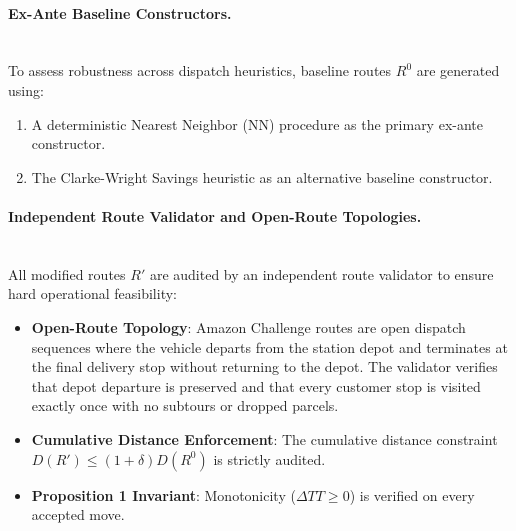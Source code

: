 \documentclass[11pt,a4paper]{article}
\begin{document}
\paragraph{Ex-Ante Baseline Constructors.}\mbox{}\\
To assess robustness across dispatch heuristics, baseline routes $R^0$ are generated using:
\begin{enumerate}
    \item A deterministic Nearest Neighbor (NN) procedure as the primary ex-ante constructor.
    \item The Clarke-Wright Savings heuristic \cite{clarke1964} as an alternative baseline constructor.
\end{enumerate}

\paragraph{Independent Route Validator and Open-Route Topologies.}\mbox{}\\
All modified routes $R'$ are audited by an independent route validator to ensure hard operational feasibility:
\begin{itemize}
    \item \textbf{Open-Route Topology}: Amazon Challenge routes are open dispatch sequences where the vehicle departs from the station depot and terminates at the final delivery stop without returning to the depot. The validator verifies that depot departure is preserved and that every customer stop is visited exactly once with no subtours or dropped parcels.
    \item \textbf{Cumulative Distance Enforcement}: The cumulative distance constraint $D(R') \le (1+\delta)D(R^0)$ is strictly audited.
    \item \textbf{Proposition 1 Invariant}: Monotonicity ($\Delta TT \ge 0$) is verified on every accepted move.
\end{itemize}
\end{document}
